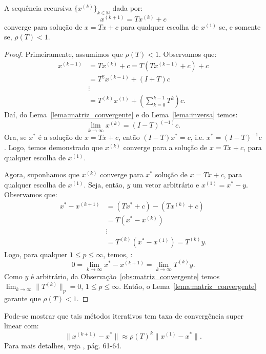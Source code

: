 \begin{teo}\label{teo:convergencia}
  A sequência recursiva $\{x^{(k)}\}_{k\in\mathbb{N}}$ dada por:
  \begin{equation*}
    x^{(k+1)} = Tx^{(k)} + c
  \end{equation*}
converge para solução de $x = Tx + c$ para qualquer escolha de $x^{(1)}$ se, e somente se, $\rho(T) < 1$.
\end{teo}
\begin{proof}
  Primeiramente, assumimos que $\rho(T) < 1$. Observamos que:
  \begin{align*}
    x^{(k+1)} &= Tx^{(k)} + c = T(Tx^{(k-1)} + c) + c \\
    &= T^2x^{(k-1)} + (I + T)c \\
    &\vdots\\
    &= T^{(k)}x^{(1)} + \left(\sum_{k=0}^{k-1}T^k\right)c.
  \end{align*}
Daí, do Lema~\ref{lema:matriz_convergente} e do Lema~\ref{lema:inversa} temos:
\begin{equation*}
  \lim_{k\to\infty} x^{(k)} = (I - T)^{(-1)}c.
\end{equation*}
Ora, se $x^*$ é a solução de $x = Tx + c$, então $(I - T)x^* = c$, i.e. $x^* = (I - T)^{-1}c$. Logo, temos demonstrado que $x^{(k)}$ converge para a solução de  $x = Tx + c$, para qualquer escolha de $x^{(1)}$.

Agora, suponhamos que $x^{(k)}$ converge para $x^*$ solução de $x = Tx + c$, para qualquer escolha de $x^{(1)}$. Seja, então, $y$ um vetor arbitrário e $x^{(1)} = x^* - y$. Observamos que:
\begin{align*}
  x^* - x^{(k+1)} &= (Tx^* + c) - (Tx^{(k)} + c) \\
  &= T(x^* - x^{(k)})\\
  &\vdots\\
  &= T^{(k)}(x^* - x^{(1)}) = T^{(k)}y.
\end{align*}
Logo, para qualquer $1 \leq p \leq\infty$, temos, :
\begin{equation*}
  0 = \lim_{k\to\infty} x^* - x^{(k+1)} = \lim_{k\to\infty} T^{(k)}y.
\end{equation*}
Como $y$ é arbitrário, da Observação~\ref{obs:matriz_convergente} temos $\displaystyle\lim_{k\to\infty} \|T^{(k)}\|_p = 0$, $1 \leq p \leq \infty$. Então, o Lema~\ref{lema:matriz_convergente} garante que $\rho(T) < 1$.
\end{proof}

\begin{obs}
  Pode-se mostrar que tais métodos iterativos tem taxa de convergência super linear com:
  \begin{equation*}
    \|x^{(k+1)} - x^*\| \approx \rho(T)^{k}\|x^{(1)} - x^*\|.
  \end{equation*}
Para mais detalhes, veja \cite{Isaacson1994a}, pág. 61-64.
\end{obs}

